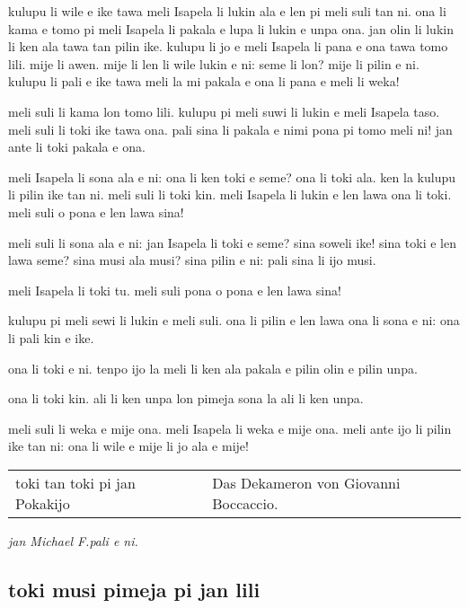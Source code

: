 kulupu li wile e ike tawa meli Isapela li lukin ala e len pi meli suli tan ni.
ona li kama e tomo pi meli Isapela li pakala e lupa li lukin e unpa ona.
jan olin li lukin li ken ala tawa tan pilin ike.
kulupu li jo e meli Isapela li pana e ona tawa tomo lili.
mije li awen.
mije li len li wile lukin e ni: seme li lon?
mije li pilin e ni.
\glqq kulupu li pali e ike tawa meli la mi pakala e ona li pana e meli li weka!\grqq

meli suli li kama lon tomo lili.
kulupu pi meli suwi li lukin e meli Isapela taso.
meli suli li toki ike tawa ona.
\glqq pali sina li pakala e nimi pona pi tomo meli ni!\grqq
jan ante li toki pakala e ona.

meli Isapela li sona ala e ni: ona li ken toki e seme?
ona li toki ala.
\glqq ken la kulupu li pilin ike tan ni.\grqq
meli suli li toki kin.
meli Isapela li lukin e len lawa ona li toki.
\glqq meli suli o pona e len lawa sina!\grqq

meli suli li sona ala e ni: jan Isapela li toki e seme?
\glqq sina soweli ike!
sina toki e len lawa seme?
sina musi ala musi?
sina pilin e ni: pali sina li ijo musi.\grqq

meli Isapela li toki tu.
\glqq meli suli pona o pona e len lawa sina!\grqq

kulupu pi meli sewi li lukin e meli suli.
ona li pilin e len lawa ona li sona e ni: ona li pali kin e ike.

ona li toki e ni.
\glqq tenpo ijo la meli li ken ala pakala e pilin olin e pilin unpa.\grqq

ona li toki kin.
\glqq ali li ken unpa lon pimeja sona la ali li ken unpa.\grqq

meli suli li weka e mije ona.
meli Isapela li weka e mije ona.
meli ante ijo li pilin ike tan ni: ona li wile e mije li jo ala e mije!

\begin{supertabular}{p{5,5cm}|ll}
toki tan toki pi jan Pokakijo && Das Dekameron von Giovanni Boccaccio. \\
\end{supertabular}

\textit{jan \glqq Michael F.\grqq   pali e ni. \cite{www:failbluedot:01}}
%
\newpage
\subsection{toki musi pimeja pi jan lili}


